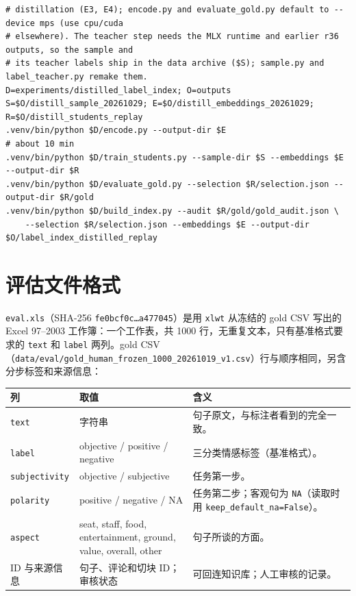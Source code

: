 \documentclass[10pt,twocolumn,a4paper]{article}
\begin{document}
\begin{Verbatim}[fontsize=\footnotesize, frame=single, framesep=3mm, rulecolor=\color{black!25}]
# distillation (E3, E4); encode.py and evaluate_gold.py default to --device mps (use cpu/cuda
# elsewhere). The teacher step needs the MLX runtime and earlier r36 outputs, so the sample and
# its teacher labels ship in the data archive ($S); sample.py and label_teacher.py remake them.
D=experiments/distilled_label_index; O=outputs
S=$O/distill_sample_20261029; E=$O/distill_embeddings_20261029; R=$O/distill_students_replay
.venv/bin/python $D/encode.py --output-dir $E                                   # about 10 min
.venv/bin/python $D/train_students.py --sample-dir $S --embeddings $E --output-dir $R
.venv/bin/python $D/evaluate_gold.py --selection $R/selection.json --output-dir $R/gold
.venv/bin/python $D/build_index.py --audit $R/gold/gold_audit.json \
    --selection $R/selection.json --embeddings $E --output-dir $O/label_index_distilled_replay
\end{Verbatim}

\section{评估文件格式}
\label{app:eval}

\texttt{eval.xls}（SHA-256 \texttt{fe0bcf0c…a477045}）是用 \texttt{xlwt} 从冻结的 gold CSV 写出的 Excel 97--2003 工作簿：一个工作表，共 \num{1000} 行，无重复文本，只有基准格式要求的 \texttt{text} 和 \texttt{label} 两列。gold CSV（\nolinkurl{data/eval/gold_human_frozen_1000_20261019_v1.csv}）行与顺序相同，另含分步标签和来源信息：

\begin{center}\small
\begin{tabularx}{\textwidth}{@{}P{34mm}P{52mm}Y@{}}
\toprule
\textbf{列} & \textbf{取值} & \textbf{含义} \\
\midrule
\texttt{text} & 字符串 & 句子原文，与标注者看到的完全一致。 \\
\texttt{label} & objective / positive / negative & 三分类情感标签（基准格式）。 \\
\texttt{subjectivity} & objective / subjective & 任务第一步。 \\
\texttt{polarity} & positive / negative / NA & 任务第二步；客观句为 \texttt{NA}（读取时用 \nolinkurl{keep_default_na=False}）。 \\
\texttt{aspect} & seat, staff, food, entertainment, ground, value, overall, other & 句子所谈的方面。 \\
ID 与来源信息 & 句子、评论和切块 ID；审核状态 & 可回连知识库；人工审核的记录。 \\
\bottomrule
\end{tabularx}
\end{center}
\end{document}
